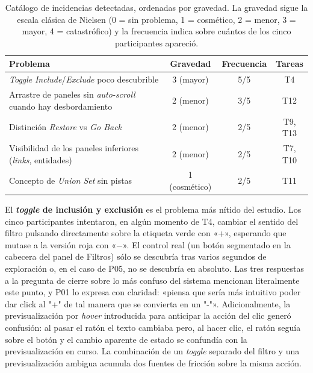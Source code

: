 \begin{table}[H]
\centering
\small
\begin{tabularx}{\textwidth}{X c c c}
\hline
\textbf{Problema}                                                  & \textbf{Gravedad} & \textbf{Frecuencia} & \textbf{Tareas} \\
\hline
\textit{Toggle} \textit{Include}/\textit{Exclude} poco descubrible          & 3 (mayor)   & 5/5 & T4 \\
Arrastre de paneles sin \textit{auto-scroll} cuando hay desbordamiento & 2 (menor) & 3/5 & T12 \\
Distinción \textit{Restore} vs \textit{Go Back}                    & 2 (menor)   & 2/5 & T9, T13 \\
Visibilidad de los paneles inferiores (\textit{links}, entidades)  & 2 (menor)   & 2/5 & T7, T10 \\
Concepto de \textit{Union Set} sin pistas                          & 1 (cosmético) & 2/5 & T11 \\
\hline
\end{tabularx}
\caption[Catálogo de incidencias detectadas]{Catálogo de incidencias detectadas, ordenadas por gravedad. La gravedad sigue
la escala clásica de Nielsen (0 = sin problema, 1 = cosmético, 2 = menor, 3 = mayor,
4 = catastrófico) y la frecuencia indica sobre cuántos de los cinco participantes apareció.}
\label{tab:incidenciasNielsen}
\end{table}

El \textbf{\textit{toggle} de inclusión y exclusión} es el problema más nítido del estudio. Los cinco
participantes intentaron, en algún momento de T4, cambiar el sentido del filtro pulsando
directamente sobre la etiqueta verde con «+», esperando que mutase a la versión roja
con «$-$». El control real (un botón segmentado en la cabecera del panel de Filtros)
sólo se descubría tras varios segundos de exploración o, en el caso de P05, no se descubría
en absoluto. Las tres respuestas a la pregunta de cierre sobre lo más confuso del sistema
mencionan literalmente este punto, y P01 lo expresa con claridad: «piensa que sería más
intuitivo poder dar click al "+" de tal manera que se convierta en un "-"». Adicionalmente,
la previsualización por \textit{hover} introducida para anticipar la acción del clic generó
confusión: al pasar el ratón el texto cambiaba pero, al hacer clic, el ratón seguía sobre
el botón y el cambio aparente de estado se confundía con la previsualización en curso. La
combinación de un \textit{toggle} separado del filtro y una previsualización ambigua acumula dos
fuentes de fricción sobre la misma acción.

